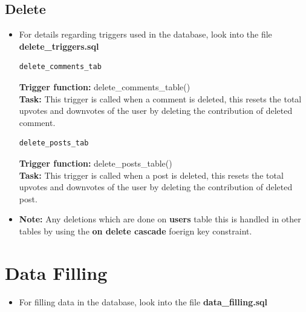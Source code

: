\documentclass[12pt,a4paper]{article}
\begin{document}
	\subsection{Delete}
		\begin{itemize}
	\item For details regarding triggers used in the database, look into the file \textbf{delete\_triggers.sql}

					\begin{lstlisting}[language=SQL, style = mystyle]
	delete_comments_tab
	\end{lstlisting}
\textbf{Trigger function: }delete\_comments\_table()\\
\textbf{Task: }This trigger is called when a comment is deleted, this resets the total upvotes and downvotes of the user by deleting the contribution of deleted comment.
					\begin{lstlisting}[language=SQL, style = mystyle]
delete_posts_tab
\end{lstlisting}
\textbf{Trigger function: }delete\_posts\_table()\\
\textbf{Task: }This trigger is called when a post is deleted, this resets the total upvotes and downvotes of the user by deleting the contribution of deleted post.
	\item \textbf{Note: }Any deletions which are done on \textbf{users} table this is handled in other tables by using the \textbf{on delete cascade} foerign key constraint.
\end{itemize}
			

	\section{Data Filling}
	\begin{itemize}
		\item For filling data in the database, look into the file  \textbf{data\_filling.sql}
	\end{itemize}
\end{document}
